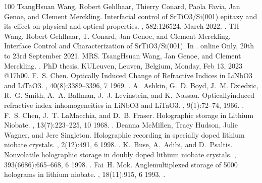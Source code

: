 \documentclass[a4paper,10pt,english,openany,oneside]{jupyterBook}
\begin{document}
\begin{sphinxthebibliography}{100}
\sphinxAtStartPar
Tsang\sphinxhyphen{}Hsuan Wang, Robert Gehlhaar, Thierry Conard, Paola Favia, Jan Genoe, and Clement Merckling. Interfacial control of SrTiO3/Si(001) epitaxy and its effect on physical and optical properties. , 582:126524, March 2022. .
\sphinxAtStartPar
T\sphinxhyphen{}H Wang, Robert Gehlhaar, T. Conard, Jan Genoe, and Clement Merckling. Interface Control and Characterization of SrTiO3/Si(001). In . online Only, 20th to 23rd September 2021. MRS.
\sphinxAtStartPar
Tsang\sphinxhyphen{}Hsuan Wang, Jan Genoe, and Clement Merckling. . PhD thesis, KULeuven, Leuven, Belgium, Monday, Feb 13, 2023 @17h00.
\sphinxAtStartPar
F. S. Chen. Optically Induced Change of Refractive Indices in LiNbO3 and LiTaO3. , 40(8):3389–3396, 7 1969. .
\sphinxAtStartPar
A. Ashkin, G. D. Boyd, J. M. Dziedzic, R. G. Smith, A. A. Ballman, J. J. Levinstein, and K. Nassau. Optically\sphinxhyphen{}induced refractive index inhomogeneities in LiNbO3 and LiTaO3. , 9(1):72–74, 1966. .
\sphinxAtStartPar
F. S. Chen, J. T. LaMacchia, and D. B. Fraser. Holographic storage in Lithium Niobate. , 13(7):223–225, 10 1968. .
\sphinxAtStartPar
Deanna McMillen, Tracy Hudson, Julie Wagner, and Jere Singleton. Holographic recording in specially doped lithium niobate crystals. , 2(12):491, 6 1998. .
\sphinxAtStartPar
K. Buse, A. Adibi, and D. Psaltis. Non\sphinxhyphen{}volatile holographic storage in doubly doped lithium niobate crystals. , 393(6686):665–668, 6 1998. .
\sphinxAtStartPar
Fai H. Mok. Angle\sphinxhyphen{}multiplexed storage of 5000 holograms in lithium niobate. , 18(11):915, 6 1993. .

\end{sphinxthebibliography}
\end{document}
